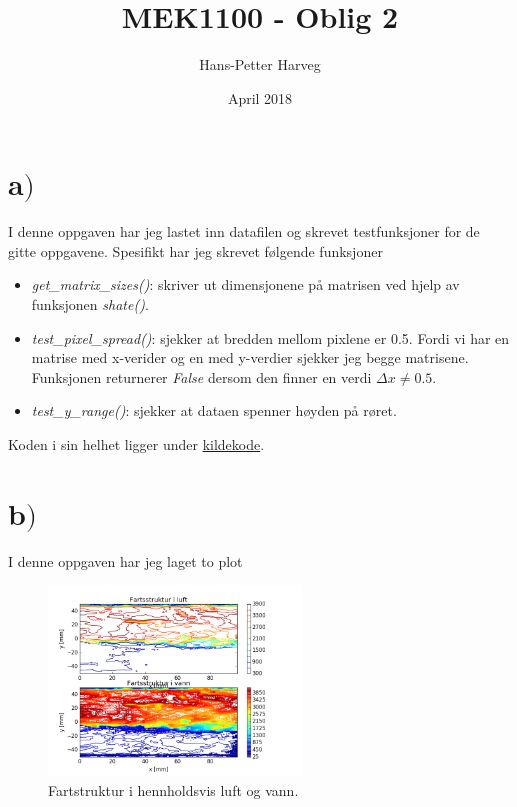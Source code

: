 \documentclass{article}
\title{MEK1100 - Oblig 2}
\author{Hans-Petter Harveg}
\date{April 2018}
\begin{document}
\maketitle

\section*{a$)$}

I denne oppgaven har jeg lastet inn datafilen og skrevet testfunksjoner for de gitte oppgavene. Spesifikt har jeg skrevet følgende funksjoner
\begin{itemize}
\item \textit{get\_matrix\_sizes()}: skriver ut dimensjonene på matrisen ved hjelp av funksjonen \textit{shate()}.
\item \textit{test\_pixel\_spread()}: sjekker at bredden mellom pixlene er 0.5. Fordi vi har en matrise med x-verider og en med y-verdier sjekker jeg begge matrisene. Funksjonen returnerer \textit{False} dersom den finner en verdi $\Delta x \neq 0.5$.
\item \textit{test\_y\_range()}: sjekker at dataen spenner høyden på røret.
\end{itemize}
Koden i sin helhet ligger under \hyperlink{sourcecode}{kildekode}.

\section*{b$)$}

I denne oppgaven har jeg laget to plot
\begin{figure}[H]
\centering
\includegraphics[width=0.6\textwidth]{problem_b}
\caption{Fartstruktur i hennholdsvis luft og vann.}
\label{fig:problem_b_contour_fig}
\end{figure}
\end{document}
